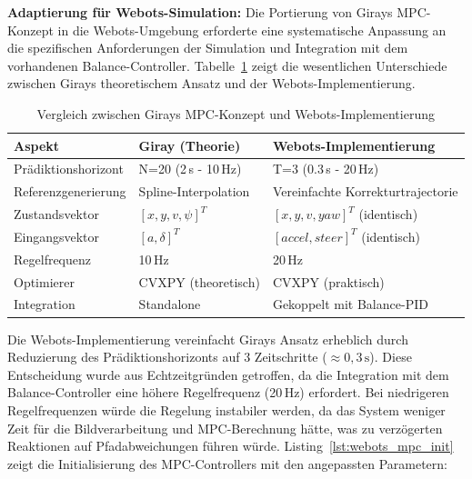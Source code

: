 \textbf{Adaptierung für Webots-Simulation:} Die Portierung von Girays MPC-Konzept in die Webots-Umgebung erforderte eine systematische 
Anpassung an die spezifischen Anforderungen der Simulation und Integration mit dem vorhandenen Balance-Controller. Tabelle~\ref{tab:giray_comparison} 
zeigt die wesentlichen Unterschiede zwischen Girays theoretischem Ansatz und der Webots-Implementierung.

\begin{table}[H]
\centering
\caption{Vergleich zwischen Girays MPC-Konzept und Webots-Implementierung}
\label{tab:giray_comparison}
\begin{tabular}{|l|l|l|}
\hline
\textbf{Aspekt} & \textbf{Giray (Theorie)} & \textbf{Webots-Implementierung} \\
\hline
Prädiktionshorizont & N=20 (2\,s - 10\,Hz) & T=3 (0.3\,s - 20\,Hz) \\
Referenzgenerierung & Spline-Interpolation & Vereinfachte Korrekturtrajectorie \\
Zustandsvektor & $[x, y, v, \psi]^T$ & $[x, y, v, yaw]^T$ (identisch) \\
Eingangsvektor & $[a, \delta]^T$ & $[accel, steer]^T$ (identisch) \\
Regelfrequenz & 10\,Hz & 20\,Hz \\
Optimierer & CVXPY (theoretisch) & CVXPY (praktisch) \\
Integration & Standalone & Gekoppelt mit Balance-PID \\
\hline
\end{tabular}
\end{table}

Die Webots-Implementierung vereinfacht Girays Ansatz erheblich durch Reduzierung des Prädiktionshorizonts auf 3 Zeitschritte 
(\(\approx 0{,}3\,\mathrm{s}\)). Diese Entscheidung wurde aus Echtzeitgründen getroffen, da die Integration mit dem Balance-Controller 
eine höhere Regelfrequenz (20\,Hz) erfordert. Bei niedrigeren Regelfrequenzen würde die Regelung instabiler werden, da das System 
weniger Zeit für die Bildverarbeitung und MPC-Berechnung hätte, was zu verzögerten Reaktionen auf Pfadabweichungen führen würde. Listing~\ref{lst:webots_mpc_init} zeigt die Initialisierung des MPC-Controllers 
mit den angepassten Parametern:

